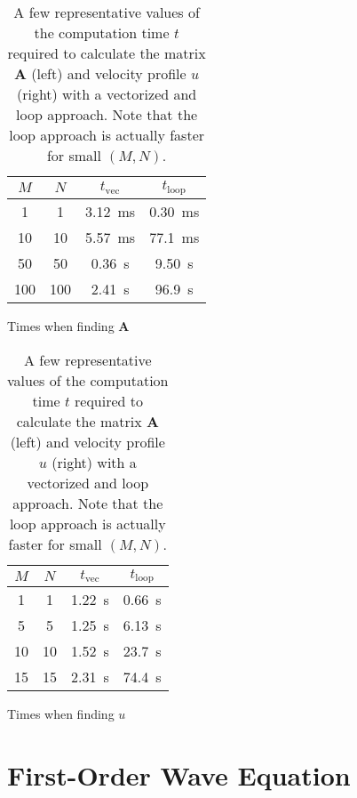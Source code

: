 \documentclass[11pt, a4paper]{article}
\newcommand{\mat}[1]{\mathbf{#1}}
\begin{document}
\begin{table}[H]
\begin{subtable}[h]{0.45\textwidth}
    \centering
	\begin{tabular}[t]{|c|c|c|c|}
		\hline {\rule{0pt}{2.3ex}} \hspace{-7pt}
		$ M $ & $ N $ & $ t_{\mathrm{vec}} $ & $ t_{\mathrm{loop}} $ \\
		\hline
		\hline {\rule{0pt}{2.3ex}} \hspace{-7pt}
		1   & 1   & \SI{3.12}{\milli \second} & \SI{0.30}{\milli \second}\\
		10  & 10  & \SI{5.57}{\milli \second} & \SI{77.1}{\milli \second}\\
		50  & 50  & \SI{0.36}{\second}        & \SI{9.50}{\second} \\
		100 & 100 & \SI{2.41}{\second}        & \SI{96.9}{\second} \\
		\hline 
	\end{tabular}
    \caption{Times when finding $ \mat{A} $}
\end{subtable}
\hspace{10mm}
\begin{subtable}[h]{0.45\textwidth}
    \centering
	\begin{tabular}[t]{|c|c|c|c|}
		\hline {\rule{0pt}{2.3ex}} \hspace{-7pt}
		$ M $ & $ N $ & $ t_{\mathrm{vec}} $ & $ t_{\mathrm{loop}} $ \\
		\hline
		\hline {\rule{0pt}{2.3ex}} \hspace{-7pt}
		1 & 1   & \SI{1.22}{\second} & \SI{0.66}{\second}\\
		5 & 5   & \SI{1.25}{\second} & \SI{6.13}{\second}\\
		10 & 10 & \SI{1.52}{\second} & \SI{23.7}{\second}\\
		15 & 15 & \SI{2.31}{\second} & \SI{74.4}{\second}\\
		\hline 
	\end{tabular}
    \caption{Times when finding $ u $}
\end{subtable}
\vspace{-2mm}
\caption{A few representative values of the computation time $ t $ required to calculate the matrix $ \mat{A} $ (left) and velocity profile $ u $ (right) with a vectorized and loop approach. Note that the loop approach is actually faster for small $ (M, N) $.}
\label{gal:table:times}
\end{table}

\section{First-Order Wave Equation}
\end{document}
